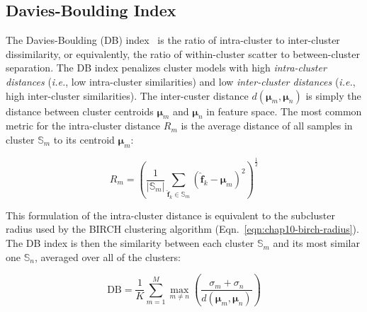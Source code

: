 
\subsection{Davies-Boulding Index}
\label{subsec:chap10-db-index}

The Davies-Boulding (DB) index~\cite{davies1979dbindex} is the ratio of intra-cluster to inter-cluster dissimilarity, or equivalently, the ratio of within-cluster scatter to between-cluster separation. The DB index penalizes cluster models with high \textit{intra-cluster distances} (\textit{i.e.}, low intra-cluster similarities) and low \textit{inter-cluster distances} (\textit{i.e.}, high inter-cluster similarities). The inter-custer distance $d\left(\boldsymbol{\mu}_{m},\boldsymbol{\mu}_{n}\right)$ is simply the distance between cluster centroids $\boldsymbol{\mu}_{m}$ and $\boldsymbol{\mu}_{n}$ in feature space. The most common metric for the intra-cluster distance $R_{m}$ is the average distance of all samples in cluster $\mathbb{S}_{m}$ to its centroid $\boldsymbol{\mu}_{m}$:

\begin{equation}
\label{eqn:chap10-db-mean-distance}
R_{m} = \left(\frac{1}{|\mathbb{S}_{m}|}\displaystyle\sum\limits_{\boldsymbol{\hat{f}}_{k} \in \mathbb{S}_{m}} \left(\boldsymbol{\hat{f}}_{k} - \boldsymbol{\mu}_{m}\right)^{2}\right)^{\frac{1}{2}}
\end{equation}

\noindent This formulation of the intra-cluster distance is equivalent to the subcluster radius used by the BIRCH clustering algorithm (Eqn.~\ref{eqn:chap10-birch-radius}). The DB index is then the similarity between each cluster $\mathbb{S}_{m}$ and its most similar one $\mathbb{S}_{n}$, averaged over all of the clusters:

\begin{equation}
\label{eqn:chap10-db-index}
\textrm{DB} = \frac{1}{K} \displaystyle\sum\limits_{m=1}^{M} \max_{m \ne n} \left(\frac{\sigma_{m} + \sigma_{n}}{d\left(\boldsymbol{\mu}_{m},\boldsymbol{\mu}_{n}\right)}\right) 
\end{equation}

